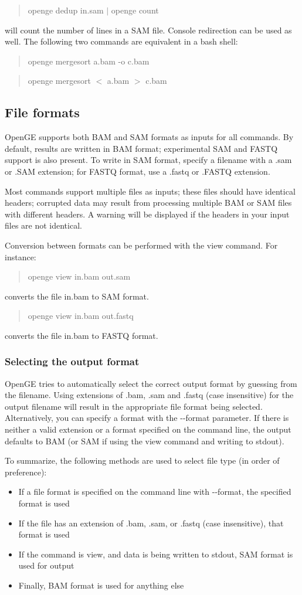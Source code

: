 \documentclass[11pt]{article}
\newcommand {\cmd}[1] {\begin{quote}#1\end{quote}}
\begin{document}
\cmd{openge dedup in.sam $|$ openge count}

will count the number of lines in a SAM file. Console redirection can be used as well. The following two commands are equivalent in a bash shell:

\cmd{openge mergesort a.bam -o c.bam}
\cmd{openge mergesort $<$ a.bam $>$ c.bam}

\subsection {File formats}

OpenGE supports both BAM and SAM formats as inputs for all commands. By default, results are written in BAM format; experimental SAM and FASTQ support is also present. To write in SAM format, specify a filename with a .sam or .SAM extension; for FASTQ format, use a .fastq or .FASTQ extension.

Most commands support multiple files as inputs; these files should have identical headers; corrupted data may result from processing multiple BAM or SAM files with different headers. A warning will be displayed if the headers in your input files are not identical.

Conversion between formats can be performed with the view command. For instance:
\cmd{openge view in.bam out.sam}
converts the file in.bam to SAM format.

\cmd{openge view in.bam out.fastq}
converts the file in.bam to FASTQ format.

\subsubsection {Selecting the output format}
OpenGE tries to automatically select the correct output format by guessing from the filename. Using extensions of .bam, .sam and .fastq (case insensitive) for the output filename will result in the appropriate file format being selected. Alternatively, you can specify a format with the {-}{-}format parameter. If there is neither a valid extension or a format specified on the command line, the output defaults to BAM (or SAM if using the view command and writing to stdout).

To summarize, the following methods are used to select file type (in order of preference):
\begin{itemize}
\item If a file format is specified on the command line with {-}{-}format, the specified format is used
\item If the file has an extension of .bam, .sam, or .fastq (case insensitive), that format is used
\item If the command is view, and data is being written to stdout, SAM format is used for output
\item Finally, BAM format is used for anything else
\end{itemize}
\end{document}
